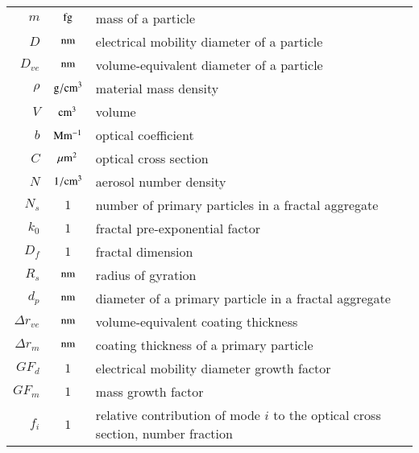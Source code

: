 \begin{tabular}{r c l}
    $m$ & $\rm fg$ & mass of a particle\\
    $D$ & $\rm nm$ & electrical mobility diameter of a particle\\
    $D_{ve}$ & $\rm nm$ & volume-equivalent diameter of a particle\\
    $\rho$ & $\rm g/cm^3$ & material mass density\\
    $V$ & $\rm cm^3$ & volume\\
    $b$ & $\rm Mm^{-1}$ & optical coefficient\\
    $C$ & $\rm \mu m^2$ & optical cross section\\
    $N$ & $\rm 1/cm^3$ & aerosol number density\\
    $N_s$ & $1$ & number of primary particles in a fractal aggregate\\
    $k_0$ & $1$ & fractal pre-exponential factor\\
    $D_f$ & $1$ & fractal dimension\\
    $R_s$ & $\rm nm$ & radius of gyration\\
    $d_p$ & $\rm nm$ & diameter of a primary particle in a fractal aggregate\\
    $\Delta r_{ve}$ & $\rm nm$ & volume-equivalent coating thickness\\
    $\Delta r_m$ & $\rm nm$& coating thickness of a primary particle\\
    $GF_d$ & $1$ & electrical mobility diameter growth factor\\
    $GF_m$ & $1$ & mass growth factor\\
    $f_i$ & $1$ & relative contribution of mode $i$ to the optical cross section, number fraction\\
\end{tabular}
